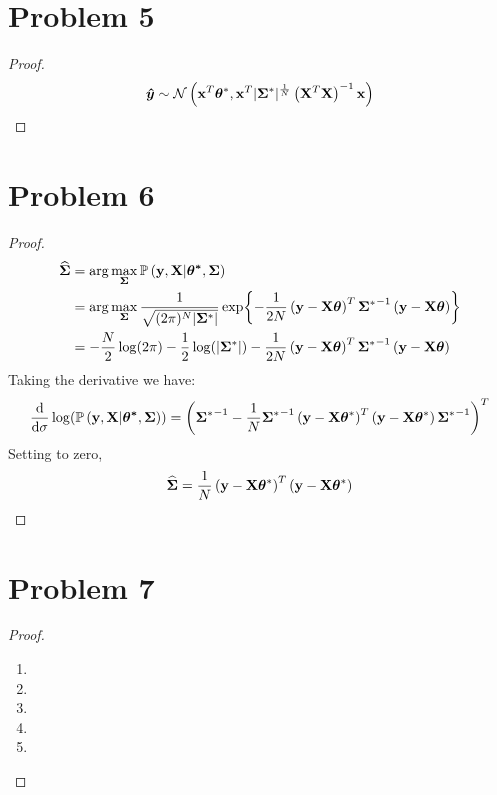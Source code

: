 \documentclass{article}
\begin{document}
\section*{Problem 5}
    \begin{proof}
        $$\vb*{\hat{y}} \sim \mathcal{N}\left(\vb{x}^T \bm{\theta}^*,\vb{x}^T |\bm{\Sigma}^*|^{\frac{1}{N}}\left(\vb{X}^T\vb{X}\right)^{-1} \vb{x} \right)$$
    \end{proof}

\section*{Problem 6}
    \begin{proof}
    \begin{align*}
        \bm{\widehat{\Sigma}}
        &=\arg{\max_{\bm{\Sigma}} \mathbb{P}\left(\vb{y},\vb{X}|\bm{\theta^*}, \bm{\Sigma}\right) }\\
        &=\arg{\max_{\bm{\Sigma}} \frac{1}{\sqrt{(2\pi)^N |\bm{\Sigma}^*|}}\exp{-\frac{1}{2N}\left(\vb{y}-\vb{X}\bm{\theta}\right)^T{\bm{\Sigma}^*}^{-1}\left(\vb{y}-\vb{X}\bm{\theta}\right)} }\\
        &=-\frac{N}{2}\log(2\pi)-\frac{1}{2}\log(|\bm{\Sigma}^*|)-\frac{1}{2N}\left(\vb{y}-\vb{X}\bm{\theta}\right)^T{\bm{\Sigma}^*}^{-1}\left(\vb{y}-\vb{X}\bm{\theta}\right)
    \end{align*}
    Taking the derivative we have:
    $$\frac{\text{d}}{\text{d}\sigma}\log(\mathbb{P}\left(\vb{y},\vb{X}|\bm{\theta^*}, \bm{\Sigma}\right))
    =\left({\bm{\Sigma}^*}^{-1}-\frac{1}{N}{\bm{\Sigma}^*}^{-1}\left(\vb{y}-\vb{X}\bm{\theta}^*\right)^T\left(\vb{y}-\vb{X}\bm{\theta}^*\right){\bm{\Sigma}^*}^{-1}\right)^T$$
    Setting to zero,
    $$\bm{\widehat{\Sigma}}=\frac{1}{N}\left(\vb{y}-\vb{X}\bm{\theta}^*\right)^T\left(\vb{y}-\vb{X}\bm{\theta}^*\right)$$
    \end{proof}

\section*{Problem 7}
    \begin{proof}
        \indent
        \begin{enumerate}[label=(\alph*)]
            \item
            \item
            \item
            \item
            \item
        \end{enumerate}
    \end{proof}
\end{document}

